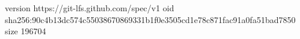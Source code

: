 version https://git-lfs.github.com/spec/v1
oid sha256:90c4b13dc574c55038670869331b1f0e3505cd1e78c871fac91a0fa51bad7850
size 196704
